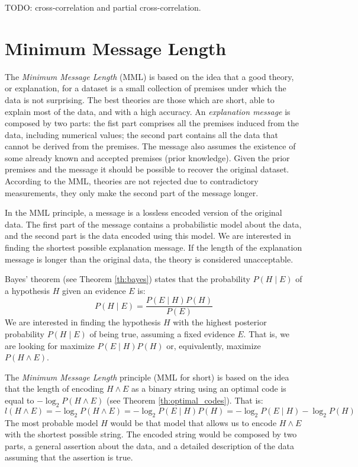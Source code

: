 {\color{red} TODO: cross-correlation and partial cross-correlation.}

%
%
\section{Minimum Message Length}
\label{sec:MML}

The \emph{Minimum Message Length} (MML) is based on the idea that a good theory, or explanation, for a dataset is a small collection of premises under which the data is not surprising. The best theories are those which are short, able to explain most of the data, and with a high accuracy. An \emph{explanation message} is composed by two parts: the fist part comprises all the premises induced from the data, including numerical values; the second part contains all the data that cannot be derived from the premises. The message also assumes the existence of some already known and accepted premises (prior knowledge). Given the prior premises and the message it should be possible to recover the original dataset. According to the MML, theories are not rejected due to contradictory measurements, they only make the second part of the message longer.

In the MML principle, a message is a lossless encoded version of the original data. The first part of the message contains a probabilistic model about the data, and the second part is the data encoded using this model. We are interested in finding the shortest possible explanation message. If the length of the explanation message is longer than the original data, the theory is considered unacceptable.

Bayes' theorem (see Theorem \ref{th:bayes}) states that the probability $P(H \mid E)$ of a hypothesis $H$ given an evidence $E$ is:
\[
    P(H \mid E) = \frac{ P( E \mid H ) P(H) }{ P(E) }
\]
We are interested in finding the hypothesis $H$ with the highest posterior probability $P(H \mid E)$ of being true, assuming a fixed evidence $E$. That is, we are looking for maximize $P( E \mid H ) P(H)$ or, equivalently, maximize $P ( H \wedge E )$.

The \emph{Minimum Message Length} principle (MML for short) is based on the idea that the length of encoding $H \wedge E$ as a binary string using an optimal code is equal to $- \log_2 P ( H \wedge E )$ (see Theorem \ref{th:optimal_codes}). That is:
\[
    l(H \wedge E) = - \log_2 P ( H \wedge E ) = - \log_2 P( E \mid H ) P(H) = - \log_2 P( E \mid H ) - \log_2 P(H)
\]
The most probable model $H$ would be that model that allows us to encode $H \wedge E$ with the shortest possible string. The encoded string would be composed by two parts, a general assertion about the data, and a detailed description of the data assuming that the assertion is true.

